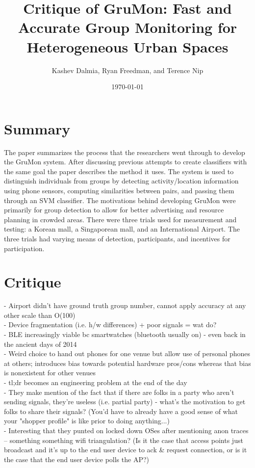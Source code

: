 \documentclass[12pt]{amsart}
\title{Critique of GruMon: Fast and Accurate Group Monitoring for Heterogeneous Urban Spaces}
\author[]{Kashev Dalmia, Ryan Freedman, and Terence Nip}
\affil[]{University of Illinois at Urbana-Champaign}
\date{\today}
\begin{document}
\maketitle

\section{\bf Summary}
The paper summarizes the process that the researchers went through to develop
the GruMon system. After discussing previous attempts to create classifiers with
the same goal the paper describes the method it uses. The system is used to
distinguish individuals from groups by detecting activity/location information
using phone sensors, computing similarities between pairs, and passing them
through an SVM classifier. The motivations behind developing GruMon were
primarily for group detection to allow for better advertising and resource
planning in crowded areas. There were three trials used for measurement and
testing: a Korean mall, a Singaporean mall, and an International Airport. The
three trials had varying means of detection, participants, and incentives for
participation.

\section{\bf Critique}
\begin{center}
- Airport didn't have ground truth group number, cannot apply accuracy at any other scale than O(100) \\
- Device fragmentation (i.e. h/w differences) + poor signals = wat do? \\
- BLE increasingly viable bc smartwatches (bluetooth usually on) - even back in the ancient days of 2014 \\
- Weird choice to hand out phones for one venue but allow use of personal phones at others; introduces bias towards potential hardware pros/cons whereas that bias is nonexistent for other venues \\
- tl;dr becomes an engineering problem at the end of the day \\
- They make mention of the fact that if there are folks in a party who aren't sending signals, they're useless (i.e. partial party) - what's the motivation to get folks to share their signals? (You'd have to already have a good sense of what your "shopper profile" is like prior to doing anything...)\\
- Interesting that they punted on locked down OSes after mentioning anon traces -- something something wifi triangulation? (Is it the case that access points just broadcast and it's up to the end user device to ack \& request connection, or is it the case that the end user device polls the AP?) \\
\end{center}
\end{document}
